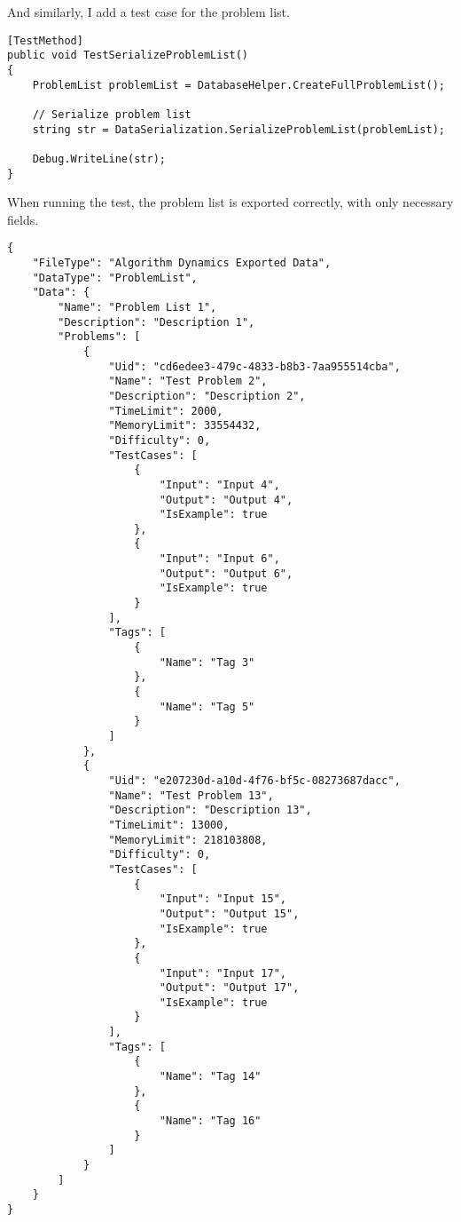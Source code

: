 \documentclass[report.tex]{subfiles}
\begin{document}
And similarly, I add a test case for the problem list.

\begin{verbatim}
[TestMethod]
public void TestSerializeProblemList()
{
    ProblemList problemList = DatabaseHelper.CreateFullProblemList();
    
    // Serialize problem list
    string str = DataSerialization.SerializeProblemList(problemList);

    Debug.WriteLine(str);
}
\end{verbatim}

When running the test, the problem list is exported correctly, with only necessary fields.

\begin{verbatim}
{
    "FileType": "Algorithm Dynamics Exported Data",
    "DataType": "ProblemList",
    "Data": {
        "Name": "Problem List 1",
        "Description": "Description 1",
        "Problems": [
            {
                "Uid": "cd6edee3-479c-4833-b8b3-7aa955514cba",
                "Name": "Test Problem 2",
                "Description": "Description 2",
                "TimeLimit": 2000,
                "MemoryLimit": 33554432,
                "Difficulty": 0,
                "TestCases": [
                    {
                        "Input": "Input 4",
                        "Output": "Output 4",
                        "IsExample": true
                    },
                    {
                        "Input": "Input 6",
                        "Output": "Output 6",
                        "IsExample": true
                    }
                ],
                "Tags": [
                    {
                        "Name": "Tag 3"
                    },
                    {
                        "Name": "Tag 5"
                    }
                ]
            },
            {
                "Uid": "e207230d-a10d-4f76-bf5c-08273687dacc",
                "Name": "Test Problem 13",
                "Description": "Description 13",
                "TimeLimit": 13000,
                "MemoryLimit": 218103808,
                "Difficulty": 0,
                "TestCases": [
                    {
                        "Input": "Input 15",
                        "Output": "Output 15",
                        "IsExample": true
                    },
                    {
                        "Input": "Input 17",
                        "Output": "Output 17",
                        "IsExample": true
                    }
                ],
                "Tags": [
                    {
                        "Name": "Tag 14"
                    },
                    {
                        "Name": "Tag 16"
                    }
                ]
            }
        ]
    }
}
\end{verbatim}
\end{document}
